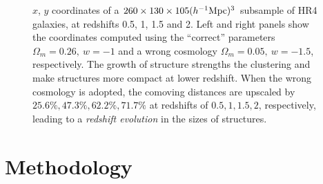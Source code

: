 \documentclass[iop]{emulateapj}
\begin{document}

\begin{figure}
   \caption{\label{fig_scatter}
  $x$, $y$ coordinates of a $260\times130\times105 (h^{-1}{\rm Mpc})^3$ subsample of HR4 galaxies, 
  at redshifts 0.5, 1, 1.5 and 2.
  Left and right panels show the coordinates computed using the ``correct'' parameters $\Omega_m=0.26,\ w=-1$ 
  and a wrong cosmology $\Omega_m=0.05,\ w=-1.5$, respectively.
  The growth of structure strengths the clustering and make structures more compact at lower redshift.
  When the wrong cosmology is adopted, the comoving distances are upscaled by $25.6\%,47.3\%,62.2\%,71.7\%$ at redshifts of $0.5,1,1.5,2$, 
  respectively, leading to a {\it redshift evolution} in the sizes of structures.
   }
\end{figure}

\section{Methodology}
\end{document}
